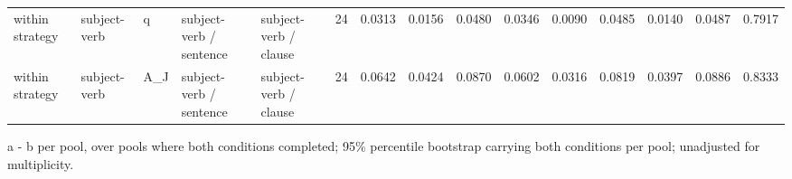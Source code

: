 \begin{table}[t]
{\begin{tabular}{lllllllllllllll}
within strategy & subject-verb & q & subject-verb / sentence & subject-verb / clause & 24 & 0.0313 & 0.0156 & 0.0480 & 0.0346 & 0.0090 & 0.0485 & 0.0140 & 0.0487 & 0.7917 \\
within strategy & subject-verb & A\_J & subject-verb / sentence & subject-verb / clause & 24 & 0.0642 & 0.0424 & 0.0870 & 0.0602 & 0.0316 & 0.0819 & 0.0397 & 0.0886 & 0.8333 \\
\bottomrule
\end{tabular}}
\par\smallskip\parbox{\linewidth}{\tiny a - b per pool, over pools where both conditions completed; 95\% percentile bootstrap carrying both conditions per pool; unadjusted for multiplicity.}
\end{table}
